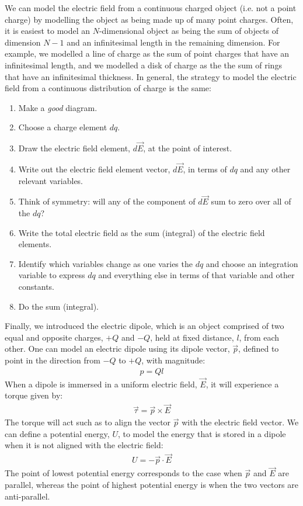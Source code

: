 \begin{chapterSummary}
We can model the electric field from a continuous charged object (i.e. not a point charge) by modelling the object as being made up of many point charges. Often, it is easiest to model an $N$-dimensional object as being the sum of objects of dimension $N-1$ and an infinitesimal length in the remaining dimension. For example, we modelled a line of charge as the sum of point charges that have an infinitesimal length, and we modelled a disk of charge as the the sum of rings that have an infinitesimal thickness. In general, the strategy to model the electric field from a continuous distribution of charge is the same:

\begin{enumerate}
\item Make a \textit{good} diagram.
\item Choose a charge element $dq$.
\item Draw the electric field element, $d\vec E$, at the point of interest.
\item Write out the electric field element vector, $d\vec E$, in terms of $dq$ and any other relevant variables.
\item Think of symmetry: will any of the component of $d\vec E$ sum to zero over all of the $dq$?
\item Write the total electric field as the sum (integral) of the electric field elements.
\item Identify which variables change as one varies the $dq$ and choose an integration variable to express $dq$ and everything else in terms of that variable and other constants.
\item Do the sum (integral).
\end{enumerate}

Finally, we introduced the electric dipole, which is an object comprised of two equal and opposite charges, $+Q$ and $-Q$, held at fixed distance, $l$, from each other. One can model an electric dipole using its dipole vector, $\vec p$, defined to point in the direction from $-Q$ to $+Q$, with magnitude:
\begin{align*}
p=Ql
\end{align*} 
When a dipole is immersed in a uniform electric field, $\vec E$, it will experience a torque given by:
\begin{align*}
\vec\tau=\vec p\times \vec E
\end{align*}
The torque will act such as to align the vector $\vec p$ with the electric field vector. We can define a potential energy, $U$, to model the energy that is stored in a dipole when it is not aligned with the electric field:
\begin{align*}
U=-\vec p \cdot \vec E
\end{align*}
The point of lowest potential energy corresponds to the case when $\vec p$ and $\vec E$ are parallel, whereas the point of highest potential energy is when the two vectors are anti-parallel.
\end{chapterSummary}

